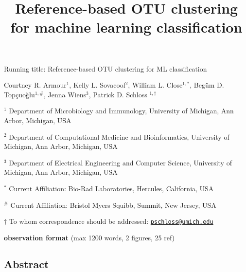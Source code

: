 \documentclass[
]{article}
\title{\textbf{Reference-based OTU clustering for machine learning
classification}}
\author{}
\date{\vspace{-2.5em}}
\begin{document}
\maketitle

\vspace{5mm}

Running title: Reference-based OTU clustering for ML classification

\vspace{10mm}

Courtney R. Armour\({^1}\), Kelly L. Sovacool\({^2}\), William L.
Close\(^{1,*}\), Begüm D. Topçuoğlu\(^{1,\#}\), Jenna Wiens\({^3}\),
Patrick D. Schloss \(^{1,\dagger}\)

\vspace{10mm}

\({^1}\) Department of Microbiology and Immunology, University of
Michigan, Ann Arbor, Michigan, USA

\({^2}\) Department of Computational Medicine and Bioinformatics,
University of Michigan, Ann Arbor, Michigan, USA

\({^3}\) Department of Electrical Engineering and Computer Science,
University of Michigan, Ann Arbor, Michigan, USA

\({^*}\) Current Affiliation: Bio-Rad Laboratories, Hercules,
California, USA

\({^\#}\) Current Affiliation: Bristol Myers Squibb, Summit, New Jersey,
USA

\(\dagger\) To whom correspondence should be addressed:
\href{mailto:pschloss@umich.edu}{\nolinkurl{pschloss@umich.edu}}

\vspace{10mm}

\textbf{observation format} (max 1200 words, 2 figures, 25 ref)

\newpage

\linenumbers

\hypertarget{abstract}{%
\subsection{Abstract}\label{abstract}}
\end{document}
